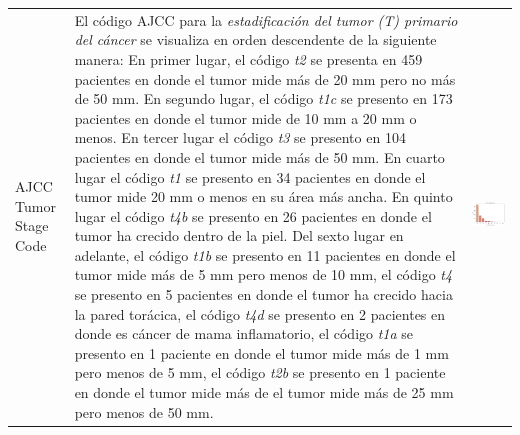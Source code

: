 \begin{table}[!htb]
	\footnotesize
	\begin{threeparttable}
		\begin{tabular}{p{2.5cm} p{7.5cm} p{6.5cm}} \toprule
			AJCC Tumor Stage Code 
			& El código AJCC para la \textit{estadificación del tumor (T) primario del cáncer} se visualiza en orden descendente de la siguiente manera: En primer lugar, el código \textit{t2} se presenta en 459 pacientes en donde el tumor mide más de 20 mm pero no más de 50 mm. En segundo lugar, el código \textit{t1c} se presento en 173 pacientes en donde el tumor mide  de 10 mm a 20 mm o menos. En tercer lugar el código \textit{t3} se presento en 104 pacientes en donde el tumor mide más de 50 mm. En cuarto lugar el código \textit{t1} se presento en 34 pacientes en donde el tumor  mide 20 mm o menos en su área más ancha. En quinto lugar el código \textit{t4b} se presento en 26 pacientes en donde el tumor ha crecido dentro de la piel. Del sexto lugar en adelante, el código \textit{t1b} se presento en 11 pacientes en donde el tumor mide más de 5 mm pero menos de 10 mm, el código \textit{t4} se presento en 5 pacientes en donde el tumor ha crecido hacia la pared torácica, el código \textit{t4d} se presento en 2 pacientes en donde es cáncer de mama inflamatorio, el código \textit{t1a} se presento en 1 paciente en donde el tumor mide más de 1 mm pero menos de 5 mm, el código \textit{t2b} se presento en 1 paciente en donde el tumor mide más de el tumor mide más de 25 mm pero menos de 50 mm.
			& \begin{center}\includegraphics[width=1\linewidth]{NOTEBOOK/IMAGENES_DESCRIPTIVAS/5_tumor_stage_code}\end{center}

\end{tabular}
\end{threeparttable}
\end{table}
